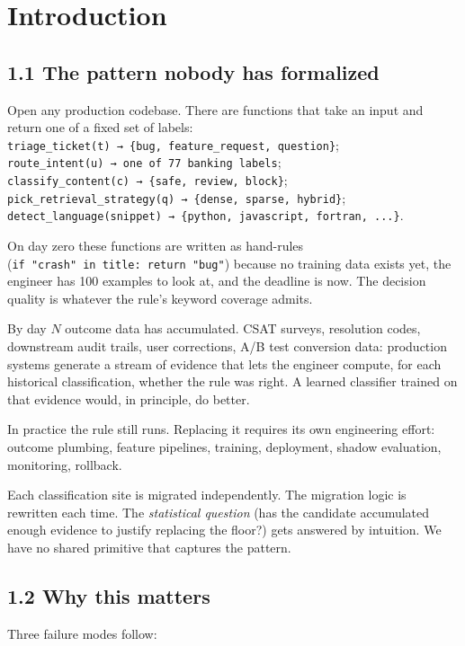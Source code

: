 \section{Introduction}\label{introduction}

\subsection{1.1 The pattern nobody has
formalized}\label{the-pattern-nobody-has-formalized}

Open any production codebase. There are functions that take an input and
return one of a fixed set of labels:
\texttt{triage\_ticket(t)\ →\ \{bug,\ feature\_request,\ question\}};
\texttt{route\_intent(u)\ →\ one\ of\ 77\ banking\ labels};
\texttt{classify\_content(c)\ →\ \{safe,\ review,\ block\}};
\texttt{pick\_retrieval\_strategy(q)\ →\ \{dense,\ sparse,\ hybrid\}};
\texttt{detect\_language(snippet)\ →\ \{python,\ javascript,\ fortran,\ ...\}}.

On day zero these functions are written as hand-rules
(\texttt{if\ "crash"\ in\ title:\ return\ "bug"}) because no training
data exists yet, the engineer has 100 examples to look at, and the
deadline is now. The decision quality is whatever the rule's keyword
coverage admits.

By day \(N\) outcome data has accumulated. CSAT surveys, resolution
codes, downstream audit trails, user corrections, A/B test conversion
data: production systems generate a stream of evidence that lets the
engineer compute, for each historical classification, whether the rule
was right. A learned classifier trained on that evidence would, in
principle, do better.

In practice the rule still runs. Replacing it requires its own
engineering effort: outcome plumbing, feature pipelines, training,
deployment, shadow evaluation, monitoring, rollback.

Each classification site is migrated independently. The migration logic
is rewritten each time. The \emph{statistical question} (has the
candidate accumulated enough evidence to justify replacing the floor?)
gets answered by intuition. We have no shared primitive that captures
the pattern.

\subsection{1.2 Why this matters}\label{why-this-matters}

Three failure modes follow:


